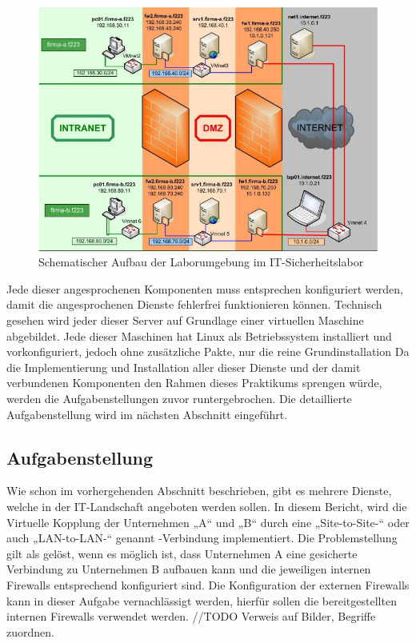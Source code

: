 \documentclass[
a4paper,     %
 headsepline, %
footsepline, %
titlepage,   %
 halfparskip,     %
 fleqn,       %
12pt         %
]{scrartcl}  %
\begin{document}
\begin{figure}[h]
	\includegraphics[width=\textwidth]{pictures/laborumgebung.png}
	\caption{Schematischer Aufbau der Laborumgebung im IT-Sicherheitslabor \cite{JueNeuSaDue}}
	\label{fig:appStat}
\end{figure}
Jede dieser angesprochenen Komponenten muss entsprechen konfiguriert werden, damit die angesprochenen Dienste fehlerfrei funktionieren können.
Technisch gesehen wird jeder dieser Server auf Grundlage einer virtuellen Maschine abgebildet.
Jede dieser Maschinen hat Linux als Betriebssystem installiert und vorkonfiguriert, jedoch ohne zusätzliche Pakte, nur die reine Grundinstallation   
Da die Implementierung und Installation aller dieser Dienste und der damit verbundenen Komponenten den Rahmen dieses Praktikums sprengen würde, werden die Aufgabenstellungen zuvor runtergebrochen. Die detaillierte Aufgabenstellung wird im nächsten Abschnitt eingeführt.

\subsection{Aufgabenstellung}
Wie schon im vorhergehenden Abschnitt beschrieben, gibt es mehrere Dienste, welche in der IT-Landschaft angeboten werden sollen. 
In diesem Bericht, wird die Virtuelle Kopplung der Unternehmen „A“ und „B“ durch eine „Site-to-Site-“ oder auch „LAN-to-LAN-“ genannt -Verbindung implementiert. 
Die Problemstellung gilt als gelöst, wenn es möglich ist, dass Unternehmen A eine gesicherte Verbindung zu Unternehmen B aufbauen kann und die jeweiligen internen Firewalls entsprechend konfiguriert sind. Die Konfiguration der externen Firewalls kann in dieser Aufgabe vernachlässigt werden, hierfür sollen die bereitgestellten internen Firewalls verwendet werden. 
//TODO Verweis auf Bilder, Begriffe zuordnen. 
 
\end{document}
